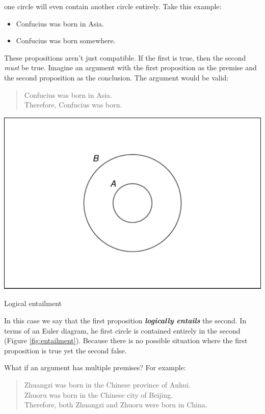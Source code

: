 \documentclass[justified]{tufte-book}
\providecommand{\tightlist}{%
  \setlength{\itemsep}{0pt}\setlength{\parskip}{0pt}}
\newenvironment{argument}{\begin{quote}\normalsize}{\end{quote}}
\theoremstyle{definition}
\theoremstyle{definition}
\theoremstyle{definition}
\theoremstyle{remark}
\begin{document}
 one circle will even contain another circle entirely. Take this example:

\begin{itemize}
\tightlist
\item
  Confucius was born in Asia.
\item
  Confucius was born somewhere.
\end{itemize}

These propositions aren't just compatible. If the first is true, then the second \emph{must} be true. Imagine an argument with the first proposition as the premise and the second proposition as the conclusion. The argument would be valid:

\begin{argument}
Confucius was born in Asia.\\
Therefore, Confucius was born.
\end{argument}

\begin{marginfigure}
\includegraphics{_main_files/figure-latex/entailment-1} \caption[Logical entailment]{Logical entailment}\label{fig:entailment}
\end{marginfigure}

In this case we say that the first proposition \textbf{\emph{logically entails}} the second. In terms of an Euler diagram, he first circle is contained entirely in the second (Figure \ref{fig:entailment}). Because there is no possible situation where the first proposition is true yet the second false.

What if an argument has multiple premises? For example:

\begin{argument}
Zhuangzi was born in the Chinese province of Anhui.\\
Zhuoru was born in the Chinese city of Beijing.\\
Therefore, both Zhuangzi and Zhuoru were born in China.
\end{argument}
\end{document}
